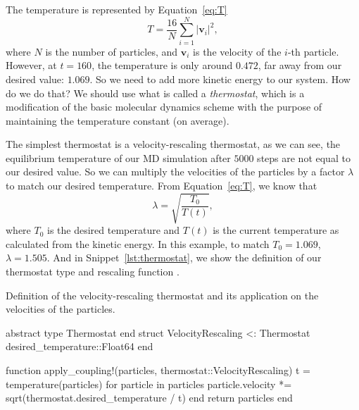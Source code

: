 The temperature is represented by Equation~\eqref{eq:T}
%
\begin{equation}\label{eq:T}
    T = \frac{ 16 }{ N } \sum_{i=1}^{N} \lvert \bm{v}_i \rvert^2,
\end{equation}
%
where $N$ is the number of particles, and $\bm{v}_i$ is the velocity of the $i$-th particle.
However, at $t = 160$, the temperature is only around $0.472$, far away from our desired
value: $1.069$. So we need to add more kinetic energy to our system. How do we do that?
We should use what is called a \emph{thermostat}, which is
a modiﬁcation of the basic molecular dynamics scheme with the purpose of maintaining the
temperature constant (on average).

The simplest thermostat is a velocity-rescaling thermostat, as we can see, the equilibrium
temperature of our MD simulation after $5000$ steps are not equal to our desired value.
So we can multiply the velocities of the particles by a factor $\lambda$ to match our
desired temperature.
From Equation~\ref{eq:T}, we know that
%
\begin{equation}
    \lambda = \sqrt{\frac{ T_0 }{ T(t) }},
\end{equation}
%
where $T_0$ is the desired temperature and $T(t)$ is the current temperature as
calculated from the kinetic energy.
In this example, to match $T_0 = 1.069$, $\lambda = 1.505$.
And in Snippet~\ref{lst:thermostat}, we show the definition of our thermostat type
 and rescaling function .
%
\begin{algorithm}
    \caption{Definition of the velocity-rescaling thermostat and its application
        on the velocities of the particles.}
    \label{lst:thermostat}
    \begin{juliacode}
        abstract type Thermostat end
        struct VelocityRescaling <: Thermostat
            desired_temperature::Float64
        end

        function apply_coupling!(particles, thermostat::VelocityRescaling)
            t = temperature(particles)
            for particle in particles
                particle.velocity *= sqrt(thermostat.desired_temperature / t)
            end
            return particles
        end
    \end{juliacode}
\end{algorithm}

